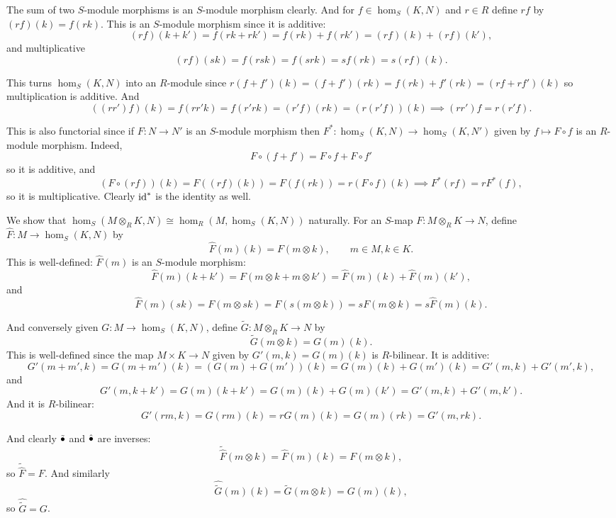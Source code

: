     \item The sum of two $S$-module morphisms is an $S$-module morphism clearly.
    And for $f\in\hom_S(K,N)$ and $r\in R$ define $rf$ by $(rf)(k)=f(rk)$.
    This is an $S$-module morphism since it is additive:
    $$ (rf)(k+k') = f(rk+rk') = f(rk) + f(rk') = (rf)(k) + (rf)(k'), $$
    and multiplicative
    $$ (rf)(sk) = f(rsk) = f(srk) = sf(rk) = s(rf)(k) . $$

    This turns $\hom_S(K,N)$ into an $R$-module since $r(f+f')(k)=(f+f')(rk)=f(rk)+f'(rk)=(rf+rf')(k)$ so multiplication is additive.
    And
    $$ ((rr')f)(k) = f(rr'k) = f(r'rk) = (r'f)(rk) = (r(r'f))(k) \implies (rr')f = r(r'f) . $$

    This is also functorial since if $F\colon N\to N'$ is an $S$-module morphism then $F^*\colon\hom_S(K,N)\to\hom_S(K,N')$ given by $f\mapsto F\circ f$
    is an $R$-module morphism.
    Indeed,
    $$ F\circ(f+f') = F\circ f + F\circ f' $$
    so it is additive, and
    $$ (F\circ(rf))(k) = F((rf)(k)) = F(f(rk)) = r(F\circ f)(k) \implies F^*(rf) = rF^*(f) , $$
    so it is multiplicative.
    Clearly ${\rm id}^*$ is the identity as well.

    \item We show that $\hom_S(M\otimes_RK,N)\cong\hom_R(M,\hom_S(K,N))$ naturally.
    For an $S$-map $F\colon M\otimes_RK\to N$, define $\hat F\colon M\to\hom_S(K,N)$ by
    $$ \hat F(m)(k) = F(m\otimes k),\qquad m\in M,k\in K . $$
    This is well-defined: $\hat F(m)$ is an $S$-module morphism:
    $$ \hat F(m)(k+k') = F(m\otimes k + m\otimes k') = \hat F(m)(k) + \hat F(m)(k') , $$
    and
    $$ \hat F(m)(sk) = F(m\otimes sk) = F(s(m\otimes k)) = sF(m\otimes k) = s\hat F(m)(k) . $$

    And conversely given $G\colon M\to\hom_S(K,N)$, define $\tilde G\colon M\otimes_RK\to N$ by
    $$ \tilde G(m\otimes k) = G(m)(k) . $$
    This is well-defined since the map $M\times K\to N$ given by $G'(m,k)=G(m)(k)$ is $R$-bilinear.
    It is additive:
    $$ G'(m+m',k) = G(m+m')(k) = (G(m)+G(m'))(k) = G(m)(k) + G(m')(k) = G'(m,k) + G'(m',k) , $$
    and
    $$ G'(m,k+k') = G(m)(k+k') = G(m)(k) + G(m)(k') = G'(m,k) + G'(m,k') . $$
    And it is $R$-bilinear:
    $$ G'(rm,k) = G(rm)(k) = rG(m)(k) = G(m)(rk) = G'(m,rk) . $$

    And clearly $\tilde{\bullet}$ and $\hat{\bullet}$ are inverses:
    $$ \tilde{\hat F}(m\otimes k) = \hat F(m)(k) = F(m\otimes k), $$
    so $\tilde{\hat F}=F$.
    And similarly
    $$ \hat{\tilde G}(m)(k) = \tilde G(m\otimes k) = G(m)(k) , $$
    so $\hat{\tilde G}=G$.

